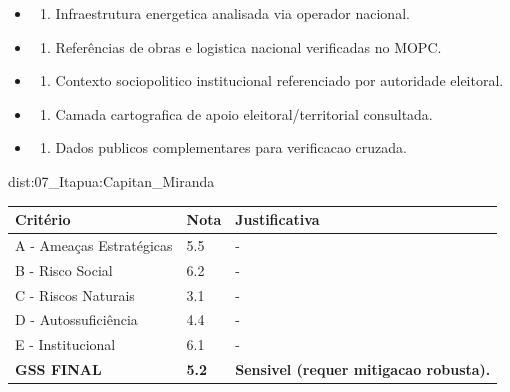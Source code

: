 {\begin{itemize}
\item
  \begin{enumerate}
  \def\labelenumi{\arabic{enumi})}
  \setcounter{enumi}{7}
  \tightlist
  \item
    Infraestrutura energetica analisada via operador nacional.
  \end{enumerate}
\item
  \begin{enumerate}
  \def\labelenumi{\arabic{enumi})}
  \setcounter{enumi}{8}
  \tightlist
  \item
    Referências de obras e logistica nacional verificadas no MOPC.
  \end{enumerate}
\item
  \begin{enumerate}
  \def\labelenumi{\arabic{enumi})}
  \setcounter{enumi}{9}
  \tightlist
  \item
    Contexto sociopolitico institucional referenciado por autoridade
    eleitoral.
  \end{enumerate}
\item
  \begin{enumerate}
  \def\labelenumi{\arabic{enumi})}
  \setcounter{enumi}{10}
  \tightlist
  \item
    Camada cartografica de apoio eleitoral/\allowbreak territorial consultada.
  \end{enumerate}
\item
  \begin{enumerate}
  \def\labelenumi{\arabic{enumi})}
  \setcounter{enumi}{11}
  \tightlist
  \item
    Dados publicos complementares para verificacao cruzada.
  \end{enumerate}
\end{itemize}}{dist:07_Itapua:Capitan_Miranda}
\begin{table}[ht!]
\small \begin{tabular}{p{3.0cm}p{0.8cm}p{6.0cm}} \toprule
\textbf{Critério} & \textbf{Nota} & \textbf{Justificativa} \\ \midrule
A - Ameaças Estratégicas & 5.5 & - \\
B - Risco Social & 6.2 & - \\
C - Riscos Naturais & 3.1 & - \\
D - Autossuficiência & 4.4 & - \\
E - Institucional & 6.1 & - \\
\midrule \textbf{GSS FINAL} & \textbf{5.2} & \textbf{Sensivel (requer mitigacao robusta).} \\ \bottomrule \end{tabular}
\end{table}
